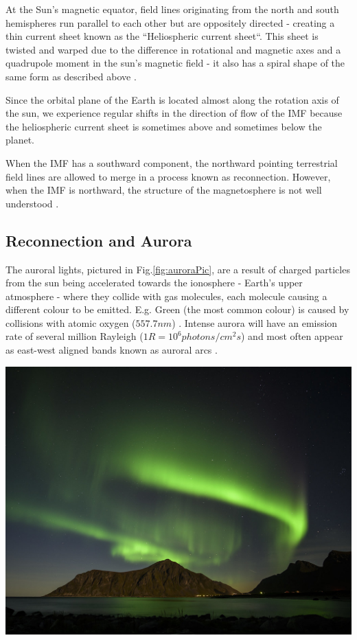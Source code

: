 \documentclass[12pt]{article}
\newenvironment{Figure}
  {\par\medskip\noindent\minipage{\linewidth}}
  {\endminipage\par\medskip}
\begin{document}
At the Sun's magnetic equator, field lines originating from the north and south hemispheres run parallel to each other but are oppositely directed - creating a thin current sheet known as the ``Heliospheric current sheet``. This sheet is twisted and warped due to the difference in rotational and magnetic axes and a quadrupole moment in the sun's magnetic field - it also has a spiral shape of the same form as described above \cite{alfven_1942, ParkerSpiral}.

Since the orbital plane of the Earth is located almost along the rotation axis of the sun, we experience regular shifts in the direction of flow of the IMF because the heliospheric current sheet is sometimes above and sometimes below the planet. 

When the IMF has a southward component, the northward pointing terrestrial field lines are allowed to merge in a process known as reconnection. However, when the IMF is northward, the structure of the magnetosphere is not well understood \cite{Fear1506}.

\subsection{Reconnection and Aurora}
The auroral lights, pictured in Fig.\ref{fig:auroraPic}, are a result of charged particles from the sun being accelerated towards the ionosphere - Earth's upper atmosphere - where they collide with gas molecules, each molecule causing a different colour to be emitted. 
E.g. Green (the most common colour) is caused by collisions with atomic oxygen ($557.7 nm$) \cite{hollier, BSPP}. Intense aurora will have an emission rate of several million Rayleigh ($1R=10^6 photons/cm^2s$) and most often appear as east-west aligned bands known as auroral arcs \cite{BSPP}.

\begin{Figure}
    \begin{minipage}[c]{0.67\textwidth}
        \centering
        \includegraphics[width=0.8\linewidth]{nothernLights.jpg}
    \end{minipage}
    \begin{minipage}[c]{0.3\textwidth}
        \label{fig:auroraPic}
    \end{minipage}
\end{Figure}
\end{document}
